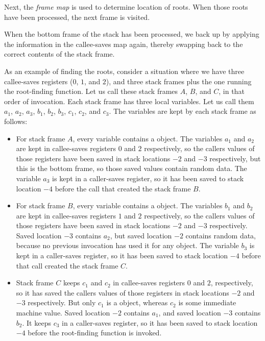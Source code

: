 Next, the \emph{frame map} is used to determine location of roots.
When those roots have been processed, the next frame is visited.

When the bottom frame of the stack has been processed, we back up by
applying the information in the callee-saves map again, thereby
swapping back to the correct contents of the stack frame.

As an example of finding the roots, consider a situation where we have
three callee-saves registers ($0$, $1$, and $2$), and three stack
frames plus the one running the root-finding function.  Let us call
these stack frames $A$, $B$, and $C$, in that order of invocation.
Each stack frame has three local variables.  Let us call them $a_1$,
$a_2$, $a_3$, $b_1$, $b_2$, $b_3$, $c_1$, $c_2$, and $c_3$.  The
variables are kept by each stack frame as follows:

\begin{itemize}
\item For stack frame $A$, every variable contains a \commonlisp{}
  object.  The variables $a_1$ and $a_2$ are kept in callee-saves
  registers $0$ and $2$ respectively, so the callers values of those
  registers have been saved in stack locations $-2$ and $-3$
  respectively, but this is the bottom frame, so those saved values
  contain random data.  The variable $a_3$ is kept in a caller-saves
  register, so it has been saved to stack location $-4$ before the
  call that created the stack frame $B$.
\item For stack frame $B$, every variable contains a \commonlisp{}
  object.  The variables $b_1$ and $b_2$ are kept in callee-saves
  registers $1$ and $2$ respectively, so the callers values of those
  registers have been saved in stack locations $-2$ and $-3$
  respectively.  Saved location $-3$ contains $a_2$, but saved
  location $-2$ contains random data, because no previous invocation
  has used it for any \commonlisp{} object.  The variable $b_3$ is
  kept in a caller-saves register, so it has been saved to stack
  location $-4$ before that call created the stack frame $C$.
\item Stack frame $C$ keeps $c_1$ and $c_2$ in callee-saves registers
  $0$ and $2$, respectively, so it has saved the callers values of
  those registers in stack locations $-2$ and $-3$ respectively.  But
  only $c_1$ is a \commonlisp{} object, whereas $c_2$ is some immediate
  machine value.  Saved location $-2$ contains $a_1$, and saved
  location $-3$ contains $b_2$.  It keeps $c_3$ in a caller-saves
  register, so it has been saved to stack location $-4$ before the
  root-finding function is invoked.
\end{itemize}

